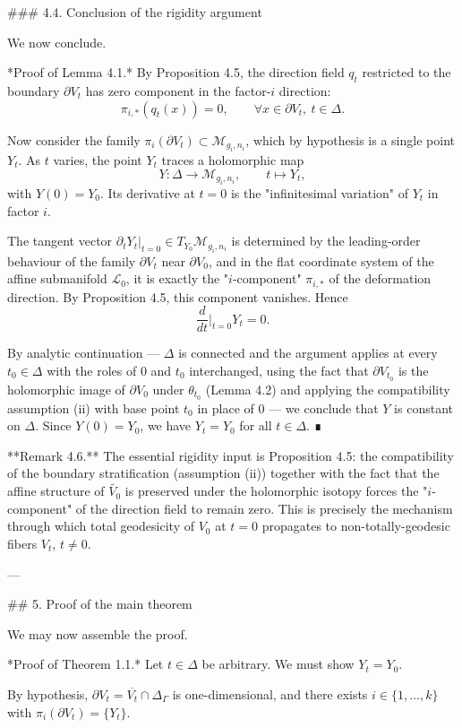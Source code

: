 ### 4.4. Conclusion of the rigidity argument

We now conclude.

*Proof of Lemma 4.1.* By Proposition 4.5, the direction field $q_t$ restricted to the boundary $\partial V_t$ has zero component in the factor-$i$ direction:
$$\pi_{i,*}(q_t(x)) = 0, \qquad \forall x \in \partial V_t, \ t \in \Delta.$$

Now consider the family $\pi_i(\partial V_t) \subset \mathcal{M}_{g_i, n_i}$, which by hypothesis is a single point $Y_t$. As $t$ varies, the point $Y_t$ traces a holomorphic map
$$Y : \Delta \to \mathcal{M}_{g_i, n_i}, \qquad t \mapsto Y_t,$$
with $Y(0) = Y_0$. Its derivative at $t = 0$ is the "infinitesimal variation" of $Y_t$ in factor $i$.

The tangent vector $\partial_t Y_t|_{t=0} \in T_{Y_0} \mathcal{M}_{g_i, n_i}$ is determined by the leading-order behaviour of the family $\partial V_t$ near $\partial V_0$, and in the flat coordinate system of the affine submanifold $\mathcal{L}_0$, it is exactly the "$i$-component" $\pi_{i,*}$ of the deformation direction. By Proposition 4.5, this component vanishes. Hence
$$\frac{d}{dt}\Big|_{t=0} Y_t = 0.$$

By analytic continuation — $\Delta$ is connected and the argument applies at every $t_0 \in \Delta$ with the roles of $0$ and $t_0$ interchanged, using the fact that $\partial V_{t_0}$ is the holomorphic image of $\partial V_0$ under $\theta_{t_0}$ (Lemma 4.2) and applying the compatibility assumption (ii) with base point $t_0$ in place of $0$ — we conclude that $Y$ is constant on $\Delta$. Since $Y(0) = Y_0$, we have $Y_t = Y_0$ for all $t \in \Delta$. ∎

**Remark 4.6.** The essential rigidity input is Proposition 4.5: the compatibility of the boundary stratification (assumption (ii)) together with the fact that the affine structure of $\widetilde{V_0}$ is preserved under the holomorphic isotopy forces the "$i$-component" of the direction field to remain zero. This is precisely the mechanism through which total geodesicity of $V_0$ at $t = 0$ propagates to non-totally-geodesic fibers $V_t$, $t \neq 0$.

---

## 5. Proof of the main theorem

We may now assemble the proof.

*Proof of Theorem 1.1.* Let $t \in \Delta$ be arbitrary. We must show $Y_t = Y_0$.

By hypothesis, $\partial V_t = \overline{V_t} \cap \Delta_\Gamma$ is one-dimensional, and there exists $i \in \{1, \ldots, k\}$ with $\pi_i(\partial V_t) = \{Y_t\}$.

